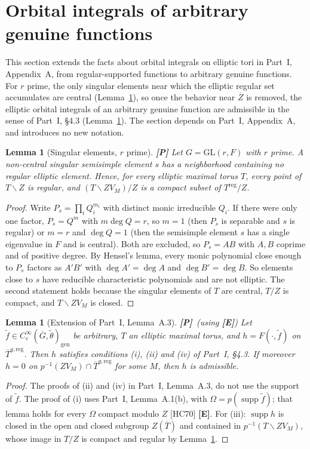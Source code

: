 \documentclass[12pt]{article}
\newcommand{\ov}[1]{\overline{#1}}
\newcommand{\gen}{\mathrm{gen}}
\newcommand{\reg}{\mathrm{reg}}
\newcommand{\supp}{\operatorname{supp}}
\newcommand{\GL}{\mathrm{GL}}
\newcommand{\Gb}{\ov{G}}
\newcommand{\Zb}{\ov{Z}}
\newcommand{\Tb}{\ov{T}}
\newcommand{\Pv}{\textbf{[P]}}
\newcommand{\Ev}{\textbf{[E]}}
\theoremstyle{plain}
\newtheorem{lemma}[theorem]{Lemma}
\theoremstyle{definition}
\begin{document}
\section{Orbital integrals of arbitrary genuine functions}\label{sec:arbitrary}
This section extends the facts about orbital integrals on elliptic tori in Part~I, Appendix~A, from regular-supported functions to arbitrary genuine functions. For $r$ prime, the only singular elements near which the elliptic regular set accumulates are central (Lemma~\ref{lem:singular}), so once the behavior near $\Zb$ is removed, the elliptic orbital integrals of an arbitrary genuine function are admissible in the sense of Part~I, \S4.3 (Lemma~\ref{lem:Aext}). The section depends on Part~I, Appendix~A, and introduces no new notation.

\begin{lemma}[Singular elements, $r$ prime]\label{lem:singular}\Pv
Let $G=\GL(r,F)$ with $r$ prime. A non-central singular semisimple element $s$ has a neighborhood containing no regular elliptic element. Hence, for every elliptic maximal torus $T$, every point of $T\smallsetminus Z$ is regular, and $(T\smallsetminus ZV_M)/Z$ is a compact subset of $T^{\reg}/Z$.
\end{lemma}
\begin{proof}
Write $P_s=\prod_iQ_i^{m_i}$ with distinct monic irreducible $Q_i$. If there were only one factor, $P_s=Q^m$ with $m\deg Q=r$, so $m=1$ (then $P_s$ is separable and $s$ is regular) or $m=r$ and $\deg Q=1$ (then the semisimple element $s$ has a single eigenvalue in $F$ and is central). Both are excluded, so $P_s=AB$ with $A,B$ coprime and of positive degree. By Hensel's lemma, every monic polynomial close enough to $P_s$ factors as $A'B'$ with $\deg A'=\deg A$ and $\deg B'=\deg B$. So elements close to $s$ have reducible characteristic polynomials and are not elliptic. The second statement holds because the singular elements of $T$ are central, $T/Z$ is compact, and $T\smallsetminus ZV_M$ is closed.
\end{proof}

\begin{lemma}[Extension of Part~I, Lemma~A.3]\label{lem:Aext}\Pv\ (using \Ev)
Let $\tilde f\in C_c^\infty(\Gb,\tilde\theta)_\gen$ be arbitrary, $T$ an elliptic maximal torus, and $h=F(\cdot,\tilde f)$ on $\Tb^{g,\reg}$. Then $h$ satisfies conditions (i), (ii) and (iv) of Part~I, \S4.3. If moreover $h=0$ on $p^{-1}(ZV_M)\cap\Tb^{g,\reg}$ for some $M$, then $h$ is admissible.
\end{lemma}
\begin{proof}
The proofs of (ii) and (iv) in Part~I, Lemma~A.3, do not use the support of $\tilde f$. The proof of (i) uses Part~I, Lemma~A.1(b), with $\Omega=p(\supp\tilde f)$; that lemma holds for every $\Omega$ compact modulo $Z$ [HC70] \Ev. For (iii): $\supp h$ is closed in the open and closed subgroup $Z(\Tb)$ and contained in $p^{-1}(T\smallsetminus ZV_M)$, whose image in $T/Z$ is compact and regular by Lemma~\ref{lem:singular}.
\end{proof}
\end{document}
